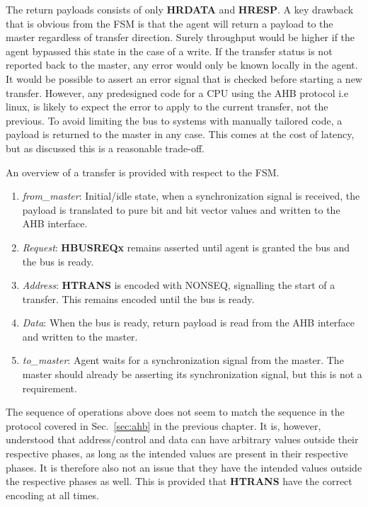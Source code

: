 The return payloads consists of only \textbf{HRDATA} and \textbf{HRESP}. A key drawback that is obvious from the FSM is that the agent will return a payload 
to the master regardless of transfer direction. Surely throughput would be higher if the agent bypassed this state in the case of a write. If the transfer
status is not reported back to the master, any error would only be known locally in the agent.  It would be possible to assert an error signal that is checked 
before starting a new transfer. However, any predesigned code for a CPU using the AHB protocol i.e linux, is likely to expect the error to apply to the current transfer, not the previous. To avoid limiting the bus to systems with manually tailored code, a payload is returned to the master in any case. This comes
at the cost of latency, but as discussed this is a reasonable trade-off. \par
An overview of a transfer is provided with respect to the FSM.
\begin{enumerate}
 \item \textit{from\_master}: Initial/idle state, when a synchronization signal is received, the payload is translated to pure bit and bit vector values and written to the AHB interface.
 \item \textit{Request}: \textbf{HBUSREQx} remains asserted until agent is granted the bus and the bus is ready.
 \item \textit{Address}: \textbf{HTRANS} is encoded with NONSEQ, signalling the start of a transfer. This remains encoded until the bus is ready.
 \item \textit{Data}: When the bus is ready, return payload is read from the AHB interface and written to the master.
 \item \textit{to\_master}: Agent waits for a synchronization signal from the master. The master should already be asserting its synchronization signal, but this is not a requirement.   
\end{enumerate}


The sequence of operations above does not seem to match the sequence in the protocol covered in Sec.~\ref{sec:ahb} in the previous chapter. It is, however, 
understood that address/control and data can have arbitrary values outside their respective phases, as long as the intended values are present in their 
respective phases. It is therefore also not an issue that they have the intended values outside the respective phases as well. This is provided that \textbf{HTRANS} have the correct encoding at all times. 
\newpage 

